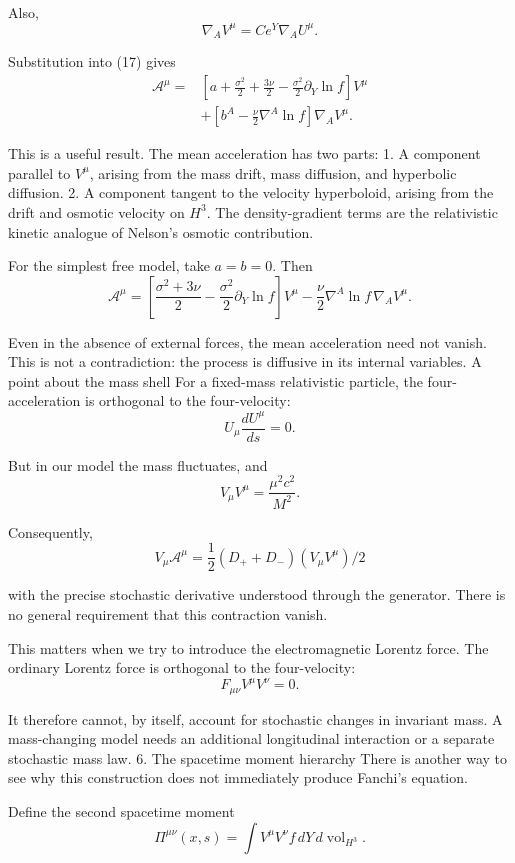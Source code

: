 Also,
\[
\nabla_A V^\mu=Ce^Y\nabla_AU^\mu.
\]

Substitution into (17) gives
\[
\boxed{
\begin{aligned}
\mathcal A^\mu={}&
\left[
a+\frac{\sigma^2}{2}+\frac{3\nu}{2}
-\frac{\sigma^2}{2}\partial_Y\ln f
\right]V^\mu\\
&+\left[
b^A-\frac{\nu}{2}\nabla^A\ln f
\right]\nabla_A V^\mu.
\end{aligned}}
\tag{20}
\]

This is a useful result. The mean acceleration has two parts:
1. A component parallel to \(V^\mu\), arising from the mass drift, mass diffusion, and hyperbolic diffusion.
2. A component tangent to the velocity hyperboloid, arising from the drift and osmotic velocity on \(H^3\).
The density-gradient terms are the relativistic kinetic analogue of Nelson's osmotic contribution.

For the simplest free model, take \(a=b=0\). Then
\[
\mathcal A^\mu
=
\left[
\frac{\sigma^2+3\nu}{2}
-\frac{\sigma^2}{2}\partial_Y\ln f
\right]V^\mu
-\frac{\nu}{2}\nabla^A\ln f\,\nabla_A V^\mu.
\tag{21}
\]

Even in the absence of external forces, the mean acceleration need not vanish. This is not a contradiction: the process is diffusive in its internal variables.
A point about the mass shell
For a fixed-mass relativistic particle, the four-acceleration is orthogonal to the four-velocity:
\[
U_\mu\frac{dU^\mu}{ds}=0.
\]

But in our model the mass fluctuates, and
\[
V_\mu V^\mu=\frac{\mu^2c^2}{M^2}.
\]

Consequently,
\[
V_\mu\mathcal A^\mu
=\frac12\left(D_++D_-\right)(V_\mu V^\mu)/2
\]

with the precise stochastic derivative understood through the generator. There is no general requirement that this contraction vanish.

This matters when we try to introduce the electromagnetic Lorentz force. The ordinary Lorentz force is orthogonal to the four-velocity:
\[
F_{\mu\nu}V^\mu V^\nu=0.
\]

It therefore cannot, by itself, account for stochastic changes in invariant mass. A mass-changing model needs an additional longitudinal interaction or a separate stochastic mass law.
6. The spacetime moment hierarchy
There is another way to see why this construction does not immediately produce Fanchi's equation.

Define the second spacetime moment
\[
\Pi^{\mu\nu}(x,s)
=
\int V^\mu V^\nu f\,
dY\,d\operatorname{vol}_{H^3}.
\tag{22}
\]

